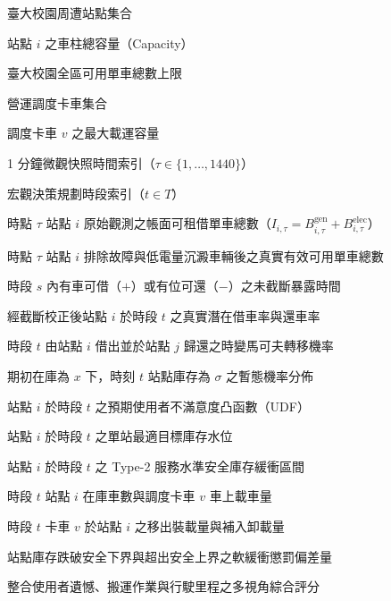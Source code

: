 
\begin{denotation}[3.5cm]

\item[$S$]{
  臺大校園周遭站點集合
}

\item[$C_i$]{
  站點 $i$ 之車柱總容量（Capacity）
}

\item[$N$]{
  臺大校園全區可用單車總數上限
}

\item[$V$]{
  營運調度卡車集合
}

\item[$\hat{C}_v$]{
  調度卡車 $v$ 之最大載運容量
}

\item[$\tau$]{
  1 分鐘微觀快照時間索引（$\tau \in \{1, \dots, 1440\}$）
}

\item[$t$]{
  宏觀決策規劃時段索引（$t \in T$）
}

\item[$I_{i,\tau}$]{
  時點 $\tau$ 站點 $i$ 原始觀測之帳面可租借單車總數（$I_{i,\tau} = B^{\text{gen}}_{i,\tau} + B^{\text{elec}}_{i,\tau}$）
}

\item[$B^{\text{eff}}_{i,\tau}$]{
  時點 $\tau$ 站點 $i$ 排除故障與低電量沉澱車輛後之真實有效可用單車總數
}

\item[$\text{Exposure}^{\pm}_{i,s}$]{
  時段 $s$ 內有車可借（$+$）或有位可還（$-$）之未截斷暴露時間
}

\item[$\hat{\lambda}_{i,t}, \hat{\mu}_{i,t}$]{
  經截斷校正後站點 $i$ 於時段 $t$ 之真實潛在借車率與還車率
}

\item[$P_t(i,j)$]{
  時段 $t$ 由站點 $i$ 借出並於站點 $j$ 歸還之時變馬可夫轉移機率
}

\item[$p_i(x, \sigma, t)$]{
  期初在庫為 $x$ 下，時刻 $t$ 站點庫存為 $\sigma$ 之暫態機率分佈
}

\item[$U_{i,t}(x)$]{
  站點 $i$ 於時段 $t$ 之預期使用者不滿意度凸函數（UDF）
}

\item[$\ell^*_{i,t}$]{
  站點 $i$ 於時段 $t$ 之單站最適目標庫存水位
}

\item[{$[\underline{\ell}_{i,t}, \bar{\ell}_{i,t}]$}]{
  站點 $i$ 於時段 $t$ 之 Type-2 服務水準安全庫存緩衝區間
}

\item[$d^t_i, \hat{d}^t_v$]{
  時段 $t$ 站點 $i$ 在庫車數與調度卡車 $v$ 車上載車量
}

\item[$r^{+, t}_{i,v}, r^{-, t}_{i,v}$]{
  時段 $t$ 卡車 $v$ 於站點 $i$ 之移出裝載量與補入卸載量
}

\item[$e^{-, t}_i, e^{+, t}_i$]{
  站點庫存跌破安全下界與超出安全上界之軟緩衝懲罰偏差量
}

\item[$\text{Score}$]{
  整合使用者遺憾、搬運作業與行駛里程之多視角綜合評分
}

\end{denotation}
